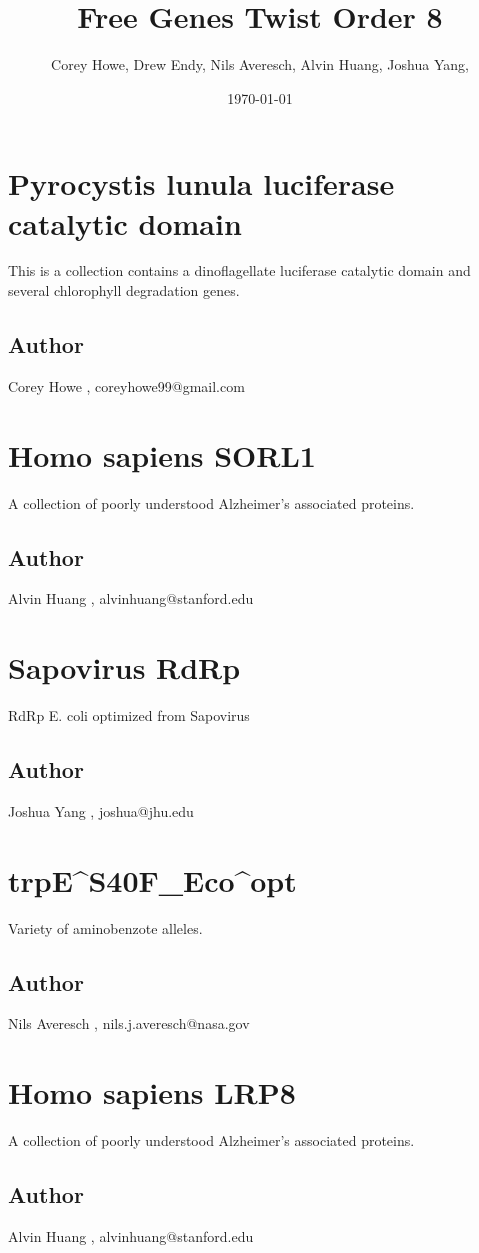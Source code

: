 \documentclass{article}%
\title{Free Genes Twist Order 8}%
\author{Corey Howe, Drew Endy, Nils Averesch, Alvin Huang, Joshua Yang, }%
\date{\today}%
\begin{document}
%
\normalsize%
\maketitle%
\section{Pyrocystis lunula luciferase catalytic domain}%
This is a collection contains a dinoflagellate  luciferase catalytic domain and several chlorophyll degradation genes.%
\subsection{Author}%
Corey Howe%
,%
coreyhowe99@gmail.com

%
\section{Homo sapiens SORL1}%
A collection of poorly understood Alzheimer's associated proteins.%
\subsection{Author}%
Alvin Huang%
,%
alvinhuang@stanford.edu

%
\section{Sapovirus RdRp}%
RdRp E. coli optimized from Sapovirus%
\subsection{Author}%
Joshua Yang%
,%
joshua@jhu.edu

%
\section{trpE\^{}S40F\_Eco\^{}opt}%
Variety of aminobenzote alleles. %
\subsection{Author}%
Nils Averesch%
,%
nils.j.averesch@nasa.gov

%
\section{Homo sapiens LRP8}%
A collection of poorly understood Alzheimer's associated proteins.%
\subsection{Author}%
Alvin Huang%
,%
alvinhuang@stanford.edu
\end{document}
